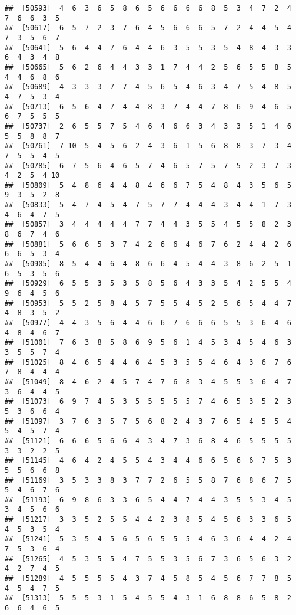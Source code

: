 \documentclass[
]{book}
\begin{document}
\begin{verbatim}
##  [50593]  4  6  3  6  5  8  6  5  6  6  6  6  8  5  3  4  7  2  4  7  6  6  3  5
##  [50617]  6  5  7  2  3  7  6  4  5  6  6  6  5  7  2  4  4  5  4  7  3  5  6  7
##  [50641]  5  6  4  4  7  6  4  4  6  3  5  5  3  5  4  8  4  3  3  6  4  3  4  8
##  [50665]  5  6  2  6  4  4  3  3  1  7  4  4  2  5  6  5  5  8  5  4  4  6  8  6
##  [50689]  4  3  3  3  7  7  4  5  6  5  4  6  3  4  7  5  4  8  5  4  7  5  3  4
##  [50713]  6  5  6  4  7  4  4  8  3  7  4  4  7  8  6  9  4  6  5  6  7  5  5  5
##  [50737]  2  6  5  5  7  5  4  6  4  6  6  3  4  3  3  5  1  4  6  5  5  8  8  7
##  [50761]  7 10  5  4  5  6  2  4  3  6  1  5  6  8  8  3  7  3  4  7  5  5  4  5
##  [50785]  6  7  5  6  4  6  5  7  4  6  5  7  5  7  5  2  3  7  3  4  2  5  4 10
##  [50809]  5  4  8  6  4  4  8  4  6  6  7  5  4  8  4  3  5  6  5  9  3  5  2  8
##  [50833]  5  4  7  4  5  4  7  5  7  7  4  4  4  3  4  4  1  7  3  4  6  4  7  5
##  [50857]  3  4  4  4  4  4  7  7  4  4  3  5  5  4  5  5  8  2  3  8  6  7  4  6
##  [50881]  5  6  6  5  3  7  4  2  6  6  4  6  7  6  2  4  4  2  6  6  6  5  3  4
##  [50905]  8  5  4  4  6  4  8  6  6  4  5  4  4  3  8  6  2  5  1  6  5  3  5  6
##  [50929]  6  5  5  3  5  3  5  8  5  6  4  3  3  5  4  2  5  5  4  9  6  4  5  6
##  [50953]  5  5  2  5  8  4  5  7  5  5  4  5  2  5  6  5  4  4  7  4  8  3  5  2
##  [50977]  4  4  3  5  6  4  4  6  6  7  6  6  6  5  5  3  6  4  6  4  8  4  6  7
##  [51001]  7  6  3  8  5  8  6  9  5  6  1  4  5  3  4  5  4  6  3  3  5  5  7  4
##  [51025]  8  4  6  5  4  4  6  4  5  3  5  5  4  6  4  3  6  7  6  7  8  4  4  4
##  [51049]  8  4  6  2  4  5  7  4  7  6  8  3  4  5  5  3  6  4  7  3  6  4  4  5
##  [51073]  6  9  7  4  5  3  5  5  5  5  5  7  4  6  5  3  5  2  3  5  3  6  6  4
##  [51097]  3  7  6  3  5  7  5  6  8  2  4  3  7  6  5  4  5  5  4  5  4  5  7  4
##  [51121]  6  6  6  5  6  6  4  3  4  7  3  6  8  4  6  5  5  5  5  3  3  2  2  5
##  [51145]  4  6  4  2  4  5  5  4  3  4  4  6  6  5  6  6  7  5  3  5  5  6  6  8
##  [51169]  3  5  3  3  8  3  7  7  2  6  5  5  8  7  6  8  6  7  5  5  4  6  7  6
##  [51193]  6  9  8  6  3  3  6  5  4  4  7  4  4  3  5  5  3  4  5  3  4  5  6  6
##  [51217]  3  3  5  2  5  5  4  4  2  3  8  5  4  5  6  3  3  6  5  4  5  3  5  4
##  [51241]  5  3  5  4  5  6  5  6  5  5  5  4  6  3  6  4  4  2  4  7  5  3  6  4
##  [51265]  4  5  3  5  5  4  7  5  5  3  5  6  7  3  6  5  6  3  2  4  2  7  4  5
##  [51289]  4  5  5  5  5  4  3  7  4  5  8  5  4  5  6  7  7  8  5  4  5  4  7  5
##  [51313]  5  5  5  3  1  5  4  5  5  4  3  1  6  8  8  6  5  8  2  6  6  4  6  5

\end{verbatim}
\end{document}
